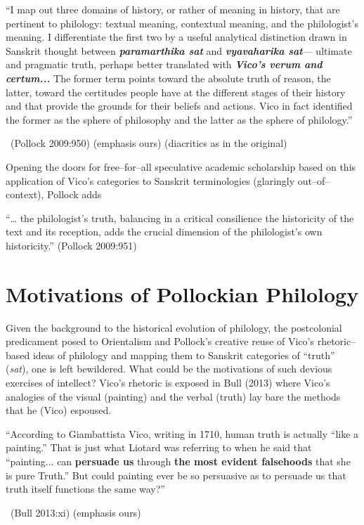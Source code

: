 \begin{myquote}
“I map out three domains of history, or rather of meaning in history, that are pertinent to philology: textual meaning, contextual meaning, and the philologist’s meaning. I differentiate the first two by a useful analytical distinction drawn in Sanskrit thought between \textbf{\textit{paramarthika sat}} and \textbf{\textit{vyavaharika sat}}— ultimate and pragmatic truth, perhaps better translated with \textbf{\textit{Vico’s verum and certum...}} The former term points toward the absolute truth of reason, the latter, toward the certitudes people have at the different stages of their history and that provide the grounds for their beliefs and actions. Vico in fact identified the former as the sphere of philosophy and the latter as the sphere of philology.”

~\hfill (Pollock 2009:950) (emphasis ours) (diacritics as in the original)
\end{myquote}

Opening the doors for free–for–all speculative academic scholarship based on this application of Vico’s categories to Sanskrit terminologies (glaringly out–of–context), Pollock adds

\begin{myquote}
“… the philologist’s truth, balancing in a critical consilience the historicity of the text and its reception, adds the crucial dimension of the philologist’s own historicity.” (Pollock 2009:951)
\end{myquote}


\section*{Motivations of Pollockian Philology}

Given the background to the historical evolution of philology, the postcolonial predicament posed to Orientalism and Pollock’s creative reuse of Vico’s rhetoric–based ideas of philology and mapping them to Sanskrit categories of “truth” (\textit{sat}), one is left bewildered. What could be the motivations of such devious exercises of intellect? Vico’s rhetoric is exposed in Bull (2013) where Vico’s analogies of the visual (painting) and the verbal (truth) lay bare the methods that he (Vico) espoused.

\begin{myquote}
“According to Giambattista Vico, writing in 1710, human truth is actually “like a painting.” That is just what Liotard was referring to when he said that “painting... can \textbf{persuade us} through \textbf{the most evident falsehoods} that she is pure Truth.” But could painting ever be so persuasive as to persuade us that truth itself functions the same way?”

~\hfill (Bull 2013:xi) (emphasis ours)
\end{myquote}

